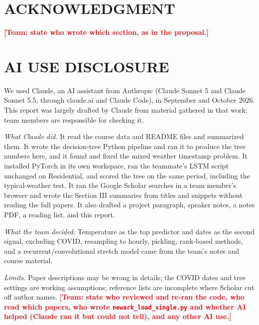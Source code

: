 \documentclass[10pt,letterpaper,twocolumn]{article}
\newcommand{\todo}[1]{\textcolor{red}{\textbf{[Team: #1]}}}
\newcommand{\code}[1]{\texttt{#1}}
\begin{document}
\section*{\centering\normalfont\small\MakeUppercase{Acknowledgment}}
\todo{state who wrote which section, as in the proposal.}

\section*{\centering\normalfont\small\MakeUppercase{AI Use Disclosure}}
We used Claude, an AI assistant from Anthropic (Claude Sonnet 5 and Claude Sonnet 5.5, through claude.ai and Claude Code), in September and October 2026. This report was largely drafted by Claude from material gathered in that work; team members are responsible for checking it.

\textit{What Claude did.} It read the course data and README files and summarized them. It wrote the decision-tree Python pipeline and ran it to produce the tree numbers here, and it found and fixed the mixed weather timestamp problem. It installed PyTorch in its own workspace, ran the teammate's LSTM script unchanged on Residential, and scored the tree on the same period, including the typical-weather test. It ran the Google Scholar searches in a team member's browser and wrote the Section III summaries from titles and snippets without reading the full papers. It also drafted a project paragraph, speaker notes, a notes PDF, a reading list, and this report.

\textit{What the team decided.} Temperature as the top predictor and dates as the second signal, excluding COVID, resampling to hourly, pickling, rank-based methods, and a recurrent/convolutional stretch model came from the team's notes and course material.

\textit{Limits.} Paper descriptions may be wrong in details; the COVID dates and tree settings are working assumptions; reference lists are incomplete where Scholar cut off author names. \todo{state who reviewed and re-ran the code, who read which papers, who wrote \code{newark\_load\_single.py} and whether AI helped (Claude ran it but could not tell), and any other AI use.}
\end{document}
